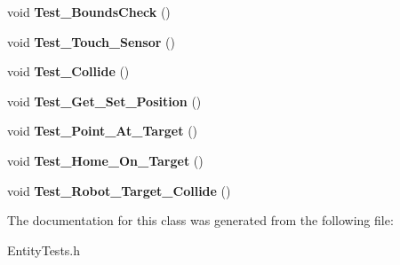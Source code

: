 \begin{DoxyCompactItemize}
\item 
\hypertarget{classEntityTests_aa071eb69b86308de0e948cc2ce8b63b2}{void {\bfseries Test\-\_\-\-Bounds\-Check} ()}\label{classEntityTests_aa071eb69b86308de0e948cc2ce8b63b2}

\item 
\hypertarget{classEntityTests_a2ee30a69ba16c465fe0b249500ba1b6d}{void {\bfseries Test\-\_\-\-Touch\-\_\-\-Sensor} ()}\label{classEntityTests_a2ee30a69ba16c465fe0b249500ba1b6d}

\item 
\hypertarget{classEntityTests_a39807fd0505ee320fdb2683ba67afd22}{void {\bfseries Test\-\_\-\-Collide} ()}\label{classEntityTests_a39807fd0505ee320fdb2683ba67afd22}

\item 
\hypertarget{classEntityTests_aceee224e305889de02c015c61888ee03}{void {\bfseries Test\-\_\-\-Get\-\_\-\-Set\-\_\-\-Position} ()}\label{classEntityTests_aceee224e305889de02c015c61888ee03}

\item 
\hypertarget{classEntityTests_adbbbe9abf38b242b9b0fb6979d988e88}{void {\bfseries Test\-\_\-\-Point\-\_\-\-At\-\_\-\-Target} ()}\label{classEntityTests_adbbbe9abf38b242b9b0fb6979d988e88}

\item 
\hypertarget{classEntityTests_a5330e1fa9789721c29c85bdb01e3d467}{void {\bfseries Test\-\_\-\-Home\-\_\-\-On\-\_\-\-Target} ()}\label{classEntityTests_a5330e1fa9789721c29c85bdb01e3d467}

\item 
\hypertarget{classEntityTests_ac7a90330b5be556829c9b15f614c7b5a}{void {\bfseries Test\-\_\-\-Robot\-\_\-\-Target\-\_\-\-Collide} ()}\label{classEntityTests_ac7a90330b5be556829c9b15f614c7b5a}

\end{DoxyCompactItemize}


The documentation for this class was generated from the following file\-:\begin{DoxyCompactItemize}
\item 
Entity\-Tests.\-h\end{DoxyCompactItemize}
